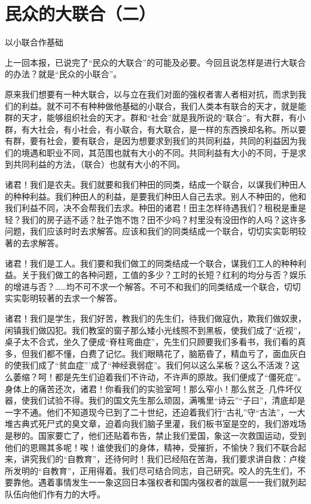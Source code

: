 \section{民众的大联合（二）}



以小联合作基础

上一回本报，已说完了“民众的大联合”的可能及必要。今回且说怎样是进行大联合的办法？就是“民众的小联合”。

原来我们想要有一种大联合，以与立在我们对面的强权者害人者相对抗，而求到我们的利益。就不可不有种种做他基础的小联合，我们人类本有联合的天才，就是能群的天才，能够组织社会的天才。群和“社会”就是我所说的“联合”。有大群，有小群，有大社会，有小社会，有小联合，有大联合，是一样的东西换却名称。所以要有群，要有社会，要有联合，是因为想要求到我们的共同利益，共同的利益因为我们的境遇和职业不同，其范围也就有大小的不同。共同利益有大小的不同，于是求到共同利益的方法，（联合）也就有大小的不同。

诸君！我们是农夫。我们就要和我们种田的同类，结成一个联合，以谋我们种田人的种种利益。我们种田人的利益，是要我们种田人自己去求。别人不种田的，他和我们利益不同，决不会帮我们去求。种田的诸君！田主怎样待遇我们？租税是重是轻？我们的房子适不适？肚子饱不饱？田不少吗？村里没有没田作的人吗？这许多问题，我们应该时时去求解答。应该和我们的同类结成一个联合，切切实实彰明较著的去求解答。

诸君！我们是工人。我们要和我们做工的同类结成一个联合，谋我们工人的种种利益。关于我们做工的各种问题，工值的多少？工时的长短？红利的均分与否？娱乐的增进与否？……均不可不求一个解答。不可不和我们的同类结成一个联合，切切实实彰明较著的去求一个解答。

诸君！我们是学生，我们好苦，教我们的先生们，待我们做寇仇，欺我们做奴隶，闲镇我们做囚犯。我们教室的窗子那么矮小光线照不到黑板，使我们成了“近视”，桌子太不合式，坐久了便成“脊柱弯曲症”，先生们只顾要我们多看书，我们看的真多，但我们都不懂，白费了记忆。我们眼睛花了，脑筋昏了，精血亏了，面血灰白的使我们成了“贫血症”’成了“神经衰弱症”。我们何以这么呆板？这么不活泼？这么萎缩？呵！都是先生们迫着我们不许动，不许声的原故。我们便成了“僵死症”。身体上的痛苦还次，诸君！你看我们的实验室呵！那么窄小！那么贫乏--几件坏仪器，使我们试验不得。我们的国文先生那么顽固，满嘴里“诗云”“子曰”，清底却是一字不通。他们不知道现今已到了二十世纪，还迫着我们行“古礼”守“古法”，一大堆古典式死尸式的臭文章，迫着向我们脑子里灌，我们板书室是空的，我们游戏场是秽的。国家要亡了，他们还贴着布告，禁止我们爱国，象这一次救国运动，受到他们的恩赐其多呢！唉！谁使我们的身体，精神，受摧折，不愉快？我们不联合起来，讲究我们的“自教育”，还待何时！我们已经陷在苦海，我们要求讲自救：卢梭所发明的“自教育”，正用得着。我们尽可结合同志，自己研究。咬人的先生们，不要靠他。遇着事情发生一一象这回日本强权者和国内强权者的跋扈一一我们就列起队伍向他们作有力的大呼。

